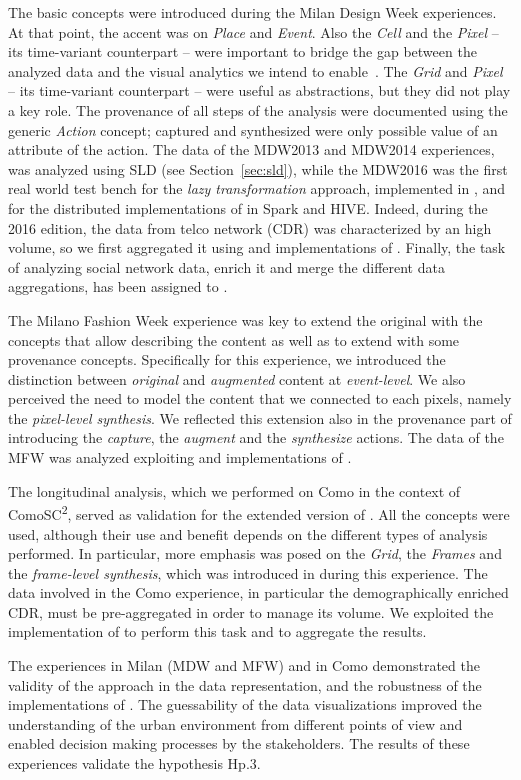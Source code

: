 The basic \frappe{} concepts were introduced during the Milan Design Week experiences. At that point, the accent was on \emph{Place} and \emph{Event}. Also the \emph{Cell} and the  \emph{Pixel} -- its time-variant counterpart -- were important to bridge the gap between the analyzed data and the visual analytics we intend to enable~\cite{DBLP:journals/ieeemm/BalduiniVALAC15}. The \emph{Grid} and  \emph{Pixel} -- its time-variant counterpart -- were useful as abstractions, but they did not play a key role. The provenance of all steps of the analysis were documented using the generic \emph{Action} concept; captured and synthesized were only possible value of an attribute of the action. 
The data of the MDW2013 and MDW2014 experiences, was analyzed using SLD (see Section~\ref{sec:sld}), while the MDW2016 was the first real world test bench for the \textit{lazy transformation} approach, implemented in \sti{}, and for the distributed implementations of \river{} in Spark and HIVE. 
Indeed, during the 2016 edition, the data from telco network (CDR) was characterized by an high volume, so we first aggregated it using \sparkdi{} and \hivedi{} implementations of \river{}. Finally, the task of analyzing social network data, enrich it and merge the different data aggregations, has been assigned to \sti{}.

The Milano Fashion Week experience was key to extend the original \frappe{} with the concepts that allow describing the content as well as to extend \frappe{} with some provenance concepts. Specifically for this experience, we introduced the distinction between \emph{original} and \emph{augmented} content at \emph{event-level}. We also perceived the need to model the content that we connected to each pixels, namely the \emph{pixel-level synthesis}. We reflected this extension also in the provenance part of \frappe{} introducing the \emph{capture}, the \emph{augment} and the \emph{synthesize} actions. The data of the MFW was analyzed exploiting \sti{} and \hivedi{} implementations of \river{}.

The longitudinal analysis, which we performed on Como in the context of ComoSC\textsuperscript{2}, served as validation for the extended version of \frappe{}. All the concepts were used, although their use and benefit depends on the different types of analysis performed. In particular, more emphasis was posed on the \emph{Grid}, the \emph{Frames} and the \emph{frame-level synthesis}, which was introduced in \frappe{} during this experience. 
The data involved in the Como experience, in particular the demographically enriched CDR, must be pre-aggregated in order to manage its volume. We exploited the \sparkdi{} implementation of \river{} to perform this task and to aggregate the results.

The experiences in Milan (MDW and MFW) and in Como demonstrated the validity of the \frappe{} approach in the data representation, and the robustness of the implementations of \river{}.
The guessability of the data visualizations improved the understanding of the urban environment from different points of view and enabled decision making processes by the stakeholders.
The results of these experiences validate the hypothesis \textsf{Hp.3}.